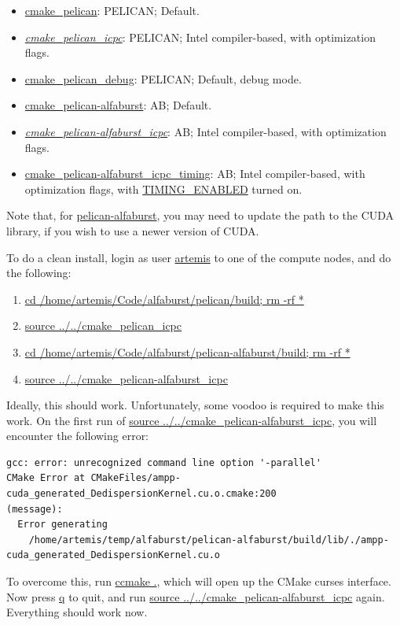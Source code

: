 \documentclass{article}
\begin{document}
\begin{itemize}
\item \url{cmake_pelican}: PELICAN; Default.
\item \emph{\url{cmake_pelican_icpc}}: PELICAN; Intel compiler-based, with
optimization flags.
\item \url{cmake_pelican_debug}: PELICAN; Default, debug mode.
\item \url{cmake_pelican-alfaburst}: AB; Default.
\item \emph{\url{cmake_pelican-alfaburst_icpc}}: AB; Intel compiler-based,
with optimization flags.
\item \url{cmake_pelican-alfaburst_icpc_timing}: AB; Intel compiler-based, with
optimization flags, with \url{TIMING_ENABLED} turned on.
\end{itemize}

Note that, for \url{pelican-alfaburst}, you may need to update the path to the
CUDA library, if you wish to use a newer version of CUDA.

To do a clean install, login as user \url{artemis} to one of the compute nodes,
and do the following:

\begin{enumerate}
\item \url{cd /home/artemis/Code/alfaburst/pelican/build; rm -rf *}
\item \url{source ../../cmake_pelican_icpc}
\item \url{cd /home/artemis/Code/alfaburst/pelican-alfaburst/build; rm -rf *}
\item \url{source ../../cmake_pelican-alfaburst_icpc}
\end{enumerate}

Ideally, this should work. Unfortunately, some voodoo is required to make this
work. On the first run of \url{source
../../cmake_pelican-alfaburst_icpc}, you will encounter the following error:

\small {
\begin{verbatim}
gcc: error: unrecognized command line option '-parallel'
CMake Error at CMakeFiles/ampp-cuda_generated_DedispersionKernel.cu.o.cmake:200
(message):
  Error generating
    /home/artemis/temp/alfaburst/pelican-alfaburst/build/lib/./ampp-cuda_generated_DedispersionKernel.cu.o
\end{verbatim}
}

To overcome this, run \url{ccmake .}, which will open up the CMake curses
interface. Now press \url{q} to quit, and run \url{source
../../cmake_pelican-alfaburst_icpc} again. Everything should work now.
\end{document}
